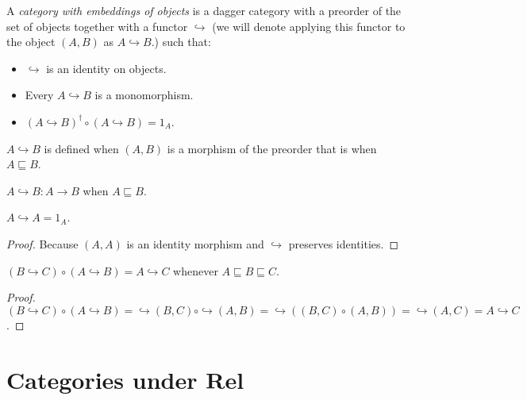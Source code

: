 \begin{defn}
  A \emph{category with embeddings of objects} is a dagger category with a
  preorder of the set of objects together with a functor $\hookrightarrow$ (we
  will denote applying this functor to the object $(A , B)$ as $A
  \hookrightarrow B$.) such that:
  \begin{itemize}
    \item $\hookrightarrow$ is an identity on objects.
    
    \item Every $A \hookrightarrow B$ is a monomorphism.
    
    \item $(A \hookrightarrow B)^{\dagger} \circ (A \hookrightarrow B) = 1_A$.
  \end{itemize}
\end{defn}

\begin{obvious}
$A\hookrightarrow B$ is defined when $(A , B)$ is a morphism of the preorder
that is when $A \sqsubseteq B$.
\end{obvious}

\begin{obvious}
$A \hookrightarrow B : A \rightarrow B$ when $A \sqsubseteq B$.
\end{obvious}

\begin{prop}
  $A \hookrightarrow A = 1_A$.
\end{prop}

\begin{proof}
  Because $(A , A)$ is an identity morphism and $\hookrightarrow$ preserves
  identities.
\end{proof}

\begin{prop}
  $(B \hookrightarrow C) \circ (A \hookrightarrow B) = A \hookrightarrow C$
  whenever $A \sqsubseteq B \sqsubseteq C$.
\end{prop}

\begin{proof}
  $(B \hookrightarrow C) \circ (A \hookrightarrow B) = \hookrightarrow (B , C)
  \circ \hookrightarrow (A , B) = \hookrightarrow ((B , C) \circ (A , B)) =
  \hookrightarrow (A , C) = A \hookrightarrow C$.
\end{proof}

\section{\texorpdfstring{Categories under $\mathbf{Rel}$}{Categories under Rel}}

